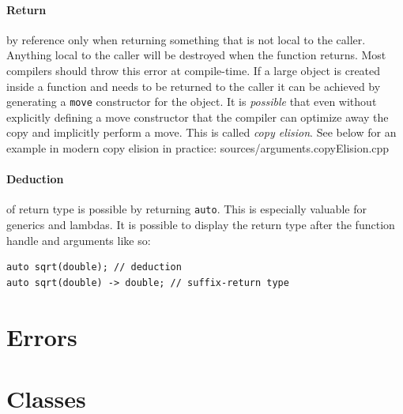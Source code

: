\documentclass[a4paper, 10pt]{article}
\begin{document}
\paragraph{Return} by reference only when returning something that is not local to the caller. Anything local to the caller will be destroyed when the function returns. Most compilers should throw this error at compile-time. If a large object is created inside a function and needs to be returned to the caller it can be achieved by generating a \verb!move! constructor for the object. It is \textit{possible} that even without explicitly defining a move constructor that the compiler can optimize away the copy and implicitly perform a move. This is called \textit{copy elision}. See below for an example in modern copy elision in practice:
 {sources/arguments.copyElision.cpp}
\paragraph{Deduction} of return type is possible by returning \verb!auto!. This is especially valuable for generics and lambdas. It is possible to display the return type after the function handle and arguments like so:
\begin{lstlisting}[style=cpp]
auto sqrt(double); // deduction
auto sqrt(double) -> double; // suffix-return type
\end{lstlisting}

\pagebreak
\section{Errors}

\pagebreak
\section{Classes}
\end{document}
